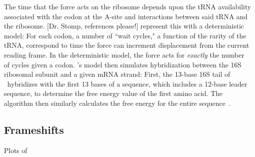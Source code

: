 \documentclass[12pt]{article}
\begin{document}
The time that the force acts on the ribosome depends upon
the tRNA availability associated with the codon at the A-site 
and interactions between said tRNA and the ribosome. [Dr. Stomp, references please!]
\citeauthor{lalit:mechanics} represent this with a deterministic model: For each codon,
a number of ``wait cycles," a function of the rarity of the
tRNA, correspond to time the force can
increment displacement from the current reading frame.  In the
deterministic model, the force acts for \emph{exactly} the number
of cycles given a codon. \cite{lalit:mechanics}'s model then simulates hybridization between the
16S ribosomal subunit and a given mRNA strand: First, the 13-base 16S
tail of \ecoli\ hybridizes with the first 13 bases of a sequence,
which includes a 12-base leader sequence, to determine the free energy 
value of the first amino acid. The algorithm then similarly calculates
the free energy for the entire sequence~\cite{starmer}.

\subsection{Frameshifts}
\label{section:frameshifts}

\begin{cfigure}
  \caption{Plots of~\prfB}
  \label{prfB:detplots}
\end{cfigure}
\end{document}
